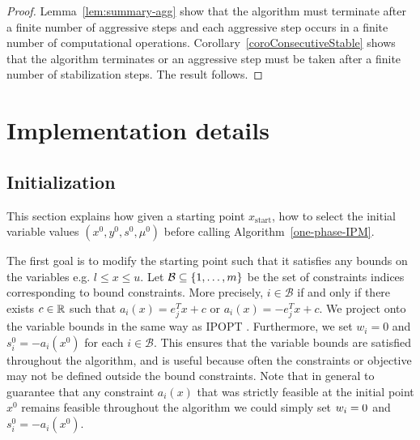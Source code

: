 \documentclass{article}
\begin{document}
\begin{proof}
Lemma~\ref{lem:summary-agg} show that the algorithm must terminate after a finite number of aggressive steps and each aggressive step occurs in a finite number of computational operations.
Corollary~\ref{coroConsecutiveStable} shows that the algorithm terminates or an aggressive step must be taken after a finite number of stabilization steps. The result follows.
\end{proof}



\section{Implementation details}\label{sec:implementation-details}


\subsection{Initialization}\label{sec:initialization}


This section explains how given a starting point $x_{\text{start}}$, how to select the initial variable values $(x^0, y^0, s^0, \mu^0)$ before calling Algorithm~\ref{one-phase-IPM}.

The first goal is to modify the starting point such that it satisfies any bounds on the variables e.g. $l \le x \le u$. Let $\mathcal{B} \subseteq \{ 1, \dots, m \}$ be the set of constraints indices corresponding to bound constraints. More precisely, $i \in \mathcal{B}$ if and only if there exists $c \in \mathbb{R}$ such that $a_i(x) = e_j^T x + c$ or $a_i(x) = -e_j^T x + c$. We project onto the variable bounds in the same way as IPOPT \cite[Section 3.7]{wachter2006implementation}. Furthermore, we set $w_i = 0$ and $s_i^{0} = -a_i(x^0)$ for each $i \in \mathcal{B}$. This ensures that the variable bounds are satisfied throughout the algorithm, and is useful because often the constraints or objective may not be defined outside the bound constraints. Note that in general to guarantee that any constraint $a_i(x)$ that was strictly feasible at the initial point $x^{0}$ remains feasible throughout the algorithm we could simply set $w_i = 0$ and $s_i^{0} = -a_i(x^0)$.
 

\end{document}
